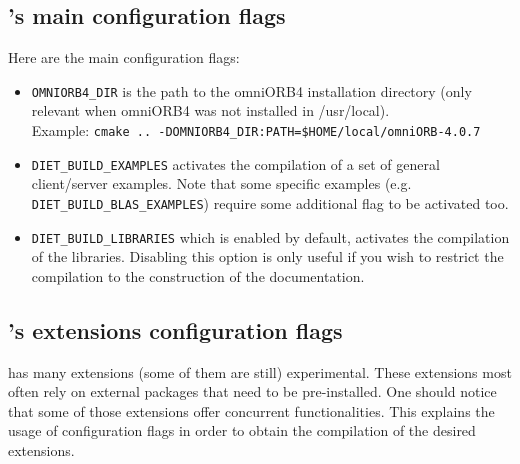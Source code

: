 \subsection{\diet's main configuration flags}

Here are the main configuration flags:
\begin{itemize}
\item
  \verb+OMNIORB4_DIR+ is the path to the omniORB4 installation
  directory (only relevant when omniORB4 was not installed in
  /usr/local).\\ Example:
  \verb+cmake .. -DOMNIORB4_DIR:PATH=$HOME/local/omniORB-4.0.7+

\item
  \verb+DIET_BUILD_EXAMPLES+ activates the compilation of a set of
  general client/server examples. Note that some specific examples
  (e.g. \verb+DIET_BUILD_BLAS_EXAMPLES+) require some additional flag
  to be activated too.

\item
  \verb+DIET_BUILD_LIBRARIES+ which is enabled by default, activates the
  compilation of the \diet libraries. Disabling this option is only useful if
  you wish to restrict the compilation to the construction of the
  documentation.
\end{itemize}

\subsection{\diet's extensions configuration flags}

\diet has many extensions (some of them are still) experimental. These
extensions most often rely on external packages that need to be
pre-installed. One should notice that some of those extensions offer concurrent
functionalities. This explains the usage of configuration flags in order to
obtain the compilation of the desired extensions.

